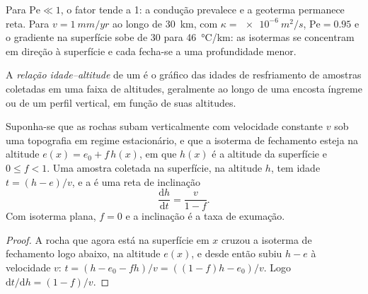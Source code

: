 Para $\mathrm{Pe} \ll 1$, o fator tende a 1: a condução prevalece e a
geoterma permanece reta. Para $v = \qty{1}{mm/yr}$ ao longo de \qty{30}{km}, com
$\kappa = \qty{e-6}{m^2/s}$, $\mathrm{Pe} = 0.95$ e o gradiente na superfície
sobe de 30 para \qty{46}{\celsius/km}: as isotermas se concentram em direção à
superfície e cada  fecha-se a uma profundidade menor.

\begin{definition}\label{def:b3:orogenic-wedges:age-elevation}
A \emph{relação idade--altitude} de um
 é o gráfico das idades de resfriamento de amostras coletadas em uma
faixa de altitudes, geralmente ao longo de uma encosta íngreme ou de um perfil vertical,
em função de suas altitudes.
\end{definition}

\begin{proposition}\label{prop:b3:orogenic-wedges:age-elevation}
Suponha-se que as rochas subam verticalmente com velocidade constante $v$ sob uma
topografia em regime estacionário, e que a isoterma de fechamento esteja na altitude $e(x) = e_0 +
f\,h(x)$, em que $h(x)$ é a altitude da superfície e $0 \le f < 1$. Uma amostra
coletada na superfície, na altitude $h$, tem idade $t = (h - e)/v$,
e a  é uma reta de inclinação
\[
  \frac{\mathrm dh}{\mathrm dt} = \frac{v}{1 - f}.
\]
Com isoterma plana, $f = 0$ e a inclinação é a taxa de exumação.
\end{proposition}

\begin{proof}
A rocha que agora está na superfície em $x$ cruzou a isoterma de fechamento logo abaixo,
na altitude $e(x)$, e desde então subiu $h - e$ à velocidade $v$:
$t = (h - e_0 - fh)/v = ((1 - f)h - e_0)/v$. Logo $\mathrm dt/\mathrm dh =
(1 - f)/v$.
\end{proof}

